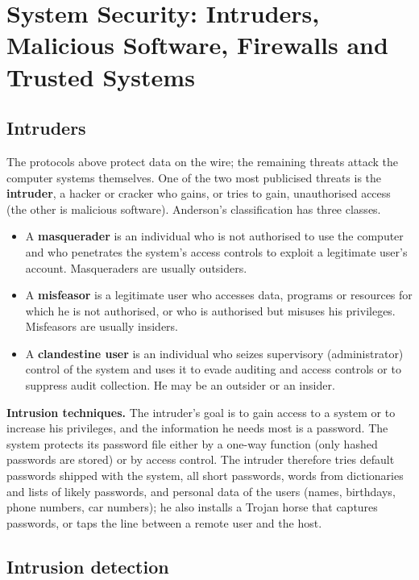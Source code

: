 \section{System Security: Intruders, Malicious Software, Firewalls and Trusted Systems}\label{sec:syssec}

\subsection{Intruders \new}

The protocols above protect data on the wire; the remaining threats attack the computer systems themselves. One of the two most publicised threats is the \textbf{intruder}, a hacker or cracker who gains, or tries to gain, unauthorised access (the other is malicious software). Anderson's classification has three classes.
\begin{itemize}
  \item A \textbf{masquerader} is an individual who is not authorised to use the computer and who penetrates the system's access controls to exploit a legitimate user's account. Masqueraders are usually outsiders.
  \item A \textbf{misfeasor} is a legitimate user who accesses data, programs or resources for which he is not authorised, or who is authorised but misuses his privileges. Misfeasors are usually insiders.
  \item A \textbf{clandestine user} is an individual who seizes supervisory (administrator) control of the system and uses it to evade auditing and access controls or to suppress audit collection. He may be an outsider or an insider.
\end{itemize}
\textbf{Intrusion techniques.} The intruder's goal is to gain access to a system or to increase his privileges, and the information he needs most is a password. The system protects its password file either by a one-way function (only hashed passwords are stored) or by access control. The intruder therefore tries default passwords shipped with the system, all short passwords, words from dictionaries and lists of likely passwords, and personal data of the users (names, birthdays, phone numbers, car numbers); he also installs a Trojan horse that captures passwords, or taps the line between a remote user and the host.

\subsection{Intrusion detection \new}

